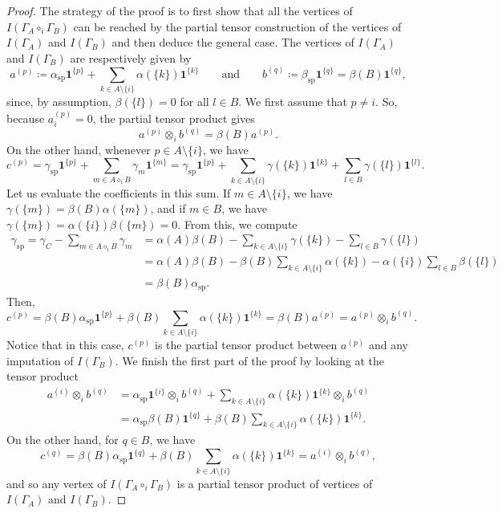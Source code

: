 \documentclass[a4paper,12pt]{amsart}
\begin{document}
\begin{proof}
The strategy of the proof is to first show that all the vertices of $I(\Gamma_A \circ_i \Gamma_B)$ can be reached by the partial tensor construction of the vertices of \(I(\Gamma_A)\) and \(I(\Gamma_B)\) and then deduce the general case. The vertices of \(I(\Gamma_A)\) and \(I(\Gamma_B)\) are respectively given by
    \[
    a^{(p)} \coloneqq \alpha_{\text{sp}} \mathbf{1}^{\{p\}} + \sum_{k \in A \setminus \{i\}} \alpha(\{k\}) \mathbf{1}^{\{k\}} \qquad \text{and} \qquad b^{(q)} \coloneqq \beta_{\text{sp}} \mathbf{1}^{\{q\}} = \beta(B) \mathbf{1}^{\{q\}},
    \]
since, by assumption,  \(\beta(\{l\}) = 0\) for all \(l \in B\). We first assume that \(p \neq i\). So, because \(a^{(p)}_i = 0\), the partial tensor product gives
    \[
    a^{(p)} \otimes_i b^{(q)} = \beta(B) a^{(p)}. 
    \]
    On the other hand, whenever \(p \in A \setminus \{i\}\), we have 
    \[
    c^{(p)} = \gamma_{\text{sp}} \mathbf{1}^{\{p\}} + \sum_{m \in A \diamond_i B} \gamma_m \mathbf{1}^{\{m\}} = \gamma_{\text{sp}} \mathbf{1}^{\{p\}} + \sum_{k \in A \setminus \{i\}} \gamma(\{k\}) \mathbf{1}^{\{k\}} + \sum_{l \in B} \gamma(\{l\}) \mathbf{1}^{\{l\}}. 
    \]
    Let us evaluate the coefficients in this sum. If \(m \in A \setminus \{i\}\), we have \(\gamma(\{m\}) = \beta(B) \alpha(\{m\})\), and if \(m \in B\), we have \(\gamma(\{m\}) = \alpha(\{i\}) \beta(\{m\}) = 0\). From this, we compute 
    \[ \begin{aligned}
    \gamma_{\text{sp}} = \gamma_C - \sum_{m \in A \diamond_i B} \gamma_m & = \alpha(A) \beta(B) - \sum_{k \in A\setminus \{i\}} \gamma(\{k\}) - \sum_{l \in B} \gamma(\{l\}) \\
    & = \alpha(A) \beta(B) - \beta(B) \sum_{k \in A \setminus \{i\}} \alpha(\{k\}) - \alpha(\{i\}) \sum_{l \in B} \beta(\{l\}) \\
    & = \beta(B) \alpha_{\text{sp}}. 
    \end{aligned} \]
    Then, 
    \[
    c^{(p)} = \beta(B) \alpha_{\text{sp}} \mathbf{1}^{\{p\}} + \beta(B) \sum_{k \in A \setminus \{i\}} \alpha(\{k\}) \mathbf{1}^{\{k\}} = \beta(B) a^{(p)} = a^{(p)} \otimes_i b^{(q)}. 
    \]
    Notice that in this case, \(c^{(p)}\) is the partial tensor product between \(a^{(p)}\) and any imputation of \(I(\Gamma_B)\). We finish the first part of the proof by looking at the tensor product
    \[ \begin{aligned} 
    a^{(i)} \otimes_i b^{(q)} & = \alpha_{\text{sp}} \mathbf{1}^{\{i\}} \otimes_i b^{(q)} + \sum_{k \in A \setminus \{i\}} \alpha(\{k\}) \mathbf{1}^{\{k\}} \otimes_i b^{(q)} \\
    & = \alpha_{\text{sp}} \beta(B) \mathbf{1}^{\{q\}} + \beta(B) \sum_{k \in A \setminus \{i\}} \alpha(\{k\})
    \mathbf{1}^{\{k\}}. 
    \end{aligned} \]
    On the other hand, for \(q \in B\), we have 
    \[
    c^{(q)} = \beta(B) \alpha_{\text{sp}} \mathbf{1}^{\{q\}} + \beta(B) \sum_{k \in A \setminus \{i\}} \alpha(\{k\}) \mathbf{1}^{\{k\}} = a^{(i)} \otimes_i b^{(q)}, 
    \]
    and so any vertex of \(I(\Gamma_A \circ_i \Gamma_B)\) is a partial tensor product of vertices of \(I(\Gamma_A)\) and \(I(\Gamma_B)\). 


\end{proof}
\end{document}
